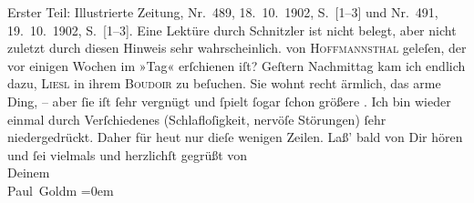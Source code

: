\begin{ledgroupsized}[t]{13cm}
{{{{                        Erster Teil: Illustrierte Zeitung}, Nr. 489, 18. 10. 1902, S. [1–3] und Nr. 491, 19. 10. 1902, S. [1–3]. Eine Lektüre durch Schnitzler ist nicht belegt, aber nicht zuletzt durch
                  diesen Hinweis sehr wahrscheinlich.}}}\label{K_L03229-8h} von \textsc{Hoffmannsthal} geleſen, der vor einigen Wochen im »Tag«
               erſchienen iſt?\pend
           \pstart
           Geſtern{ }Nachmittag kam ich endlich dazu, \textsc{Liesl} in ihrem \textsc{Boudoir} zu beſuchen. Sie wohnt recht
               ärmlich, das arme Ding, – aber ſie iſt ſehr vergnügt und ſpielt ſogar ſchon größere
                  \label{K_L03229-9v}\label{K_L03229-9h}.\pend
           \pstart
           Ich bin wieder einmal durch Verſchiedenes (Schlafloſigkeit, nervöſe Störungen) ſehr
                  {\pb}niedergedrückt. Daher für heut nur dieſe wenigen Zeilen.\pend
           \pstart
           Laß’ bald von Dir hören und ſei vielmals und herzlichſt gegrüßt von {\\[\baselineskip]}Deinem {\\[\baselineskip]}\spacefill\mbox{Paul Goldm}\pend
           \leftskip=0em{}
         
         \endnumbering{}\end{ledgroupsized}  \newcommand{\dateiname}{L03229}\newcommand{\titel}{Paul Goldmann an Arthur Schnitzler, 10. 11. [1902]}\newcommand{\editorInnen}{Martin Anton Müller und Laura Untner}
      
